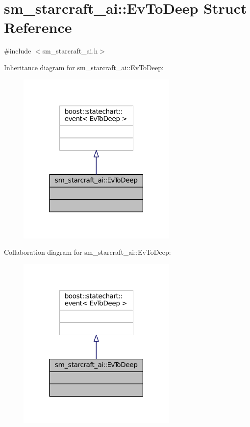 \hypertarget{structsm__starcraft__ai_1_1EvToDeep}{}\section{sm\+\_\+starcraft\+\_\+ai\+:\+:Ev\+To\+Deep Struct Reference}
\label{structsm__starcraft__ai_1_1EvToDeep}


{\ttfamily \#include $<$sm\+\_\+starcraft\+\_\+ai.\+h$>$}



Inheritance diagram for sm\+\_\+starcraft\+\_\+ai\+:\+:Ev\+To\+Deep\+:
\nopagebreak
\begin{figure}[H]
\begin{center}
\leavevmode
\includegraphics[width=223pt]{structsm__starcraft__ai_1_1EvToDeep__inherit__graph}
\end{center}
\end{figure}


Collaboration diagram for sm\+\_\+starcraft\+\_\+ai\+:\+:Ev\+To\+Deep\+:
\nopagebreak
\begin{figure}[H]
\begin{center}
\leavevmode
\includegraphics[width=223pt]{structsm__starcraft__ai_1_1EvToDeep__coll__graph}
\end{center}
\end{figure}


